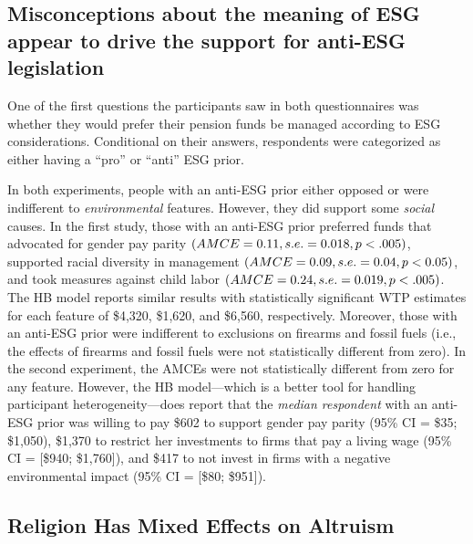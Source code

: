 \documentclass[
  12pt,
]{article}
\begin{document}
\hypertarget{misconceptions-about-the-meaning-of-esg-appear-to-drive-the-support-for-anti-esg-legislation}{%
\subsection{Misconceptions about the meaning of ESG appear to drive the support for anti-ESG legislation}\label{misconceptions-about-the-meaning-of-esg-appear-to-drive-the-support-for-anti-esg-legislation}}

One of the first questions the participants saw in both questionnaires was whether they would prefer their pension funds be managed according to ESG considerations. Conditional on their answers, respondents were categorized as either having a ``pro'' or ``anti'' ESG prior.

In both experiments, people with an anti-ESG prior either opposed or were indifferent to \emph{environmental} features. However, they did support some \emph{social} causes. In the first study, those with an anti-ESG prior preferred funds that advocated for gender pay parity \((AMCE = 0.11, \space s.e.=0.018, \space p <.005)\), supported racial diversity in management \((AMCE = 0.09, \space s.e.=0.04, \space p <0.05)\), and took measures against child labor \((AMCE = 0.24, \space s.e.=0.019, \space p <.005)\). The HB model reports similar results with statistically significant WTP estimates for each feature of \$4,320, \$1,620, and \$6,560, respectively. Moreover, those with an anti-ESG prior were indifferent to exclusions on firearms and fossil fuels (i.e., the effects of firearms and fossil fuels were not statistically different from zero). In the second experiment, the AMCEs were not statistically different from zero for any feature. However, the HB model---which is a better tool for handling participant heterogeneity---does report that the \emph{median respondent} with an anti-ESG prior was willing to pay \$602 to support gender pay parity (95\% CI = \$35; \$1,050), \$1,370 to restrict her investments to firms that pay a living wage (95\% CI = {[}\$940; \$1,760{]}), and \$417 to not invest in firms with a negative environmental impact (95\% CI = {[}\$80; \$951{]}).

\hypertarget{religion-has-mixed-effects-on-altruism}{%
\subsection{Religion Has Mixed Effects on Altruism}\label{religion-has-mixed-effects-on-altruism}}
\end{document}
